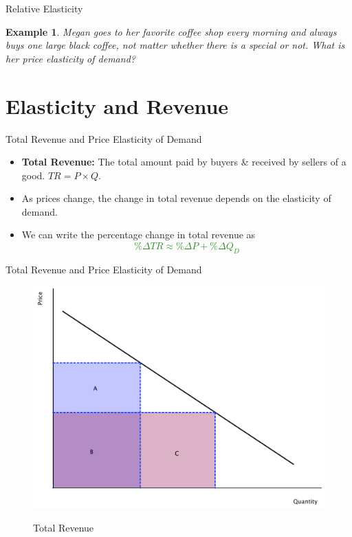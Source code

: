 \documentclass[xcolor={dvipsnames},pdf, hyperref={colorlinks=true, citecolor=ForestGreen, linkcolor=BlueViolet, urlcolor=Magenta}]{beamer}
\newtheorem{exmp}{Example}[section]
\newcommand{\defn}[1]{\textbf{#1}}
\newcommand{\ddp}[1]{{\textcolor{ForestGreen}{#1}}}
\begin{document}
\begin{frame}{Relative Elasticity}
	
	\begin{exmp} 
		Megan goes to her favorite coffee shop every morning and always buys one large black coffee, not matter whether there is a special or not. What is her price elasticity of demand?
	\end{exmp}

\pause	\ddp{No matter what the price is, quantity demanded does not change. Her price elasticity of demand is zero and she has a perfectly inelastic demand curve.}
	
\end{frame}

\section{Elasticity and Revenue}

\begin{frame}{Total Revenue and Price Elasticity of Demand}
\begin{itemize}
	\item \defn{Total Revenue:} The total amount paid by buyers \& received by sellers of a good. $TR = P\times Q$.
	\item As prices change, the change in total revenue depends on the elasticity of demand.
	\item 	We can write the percentage change in total revenue as \ddp{\[\%\Delta TR \approx \% \Delta P + \%\Delta Q_D\]}

	
\end{itemize}
\end{frame}

\begin{frame}{Total Revenue and Price Elasticity of Demand}

		\begin{figure}[H]
			\centering
			\ddp{\includegraphics[scale=.25]{plot26.pdf}}
			\caption{Total Revenue}
		\end{figure}
		
\end{frame}
\end{document}
